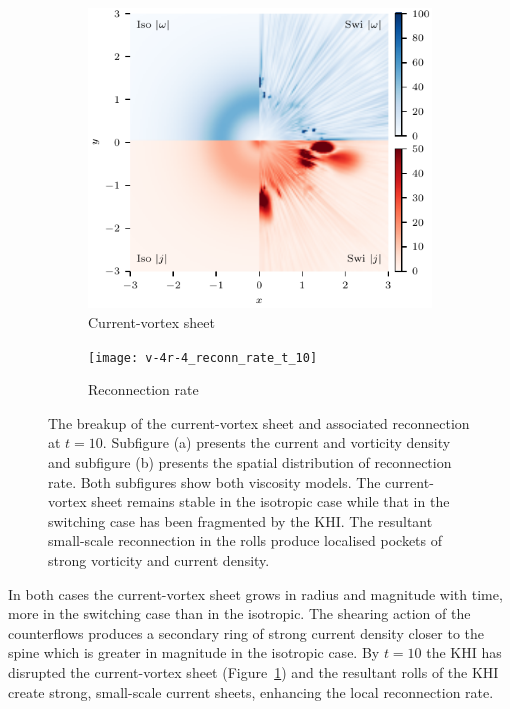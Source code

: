 \begin{figure}[t]
  \centering
    \begin{subfigure}{0.48\textwidth}
      \includegraphics[width=\linewidth]{v-4r-4_vorticity_current_ring_t_10}
      \caption{Current-vortex sheet}
      \label{fig:v-4r-4_vorticity_current_ring_t_10}
    \end{subfigure}
    \hfill
    \begin{subfigure}{0.48\textwidth}
      \texttt{[image: v-4r-4\_reconn\_rate\_t\_10]}
      \caption{Reconnection rate}
      \label{fig:v-4r-4_reconn_rate_t_10}
    \end{subfigure}
\caption{The breakup of the current-vortex sheet and associated reconnection at $t=10$. Subfigure (a) presents the current and vorticity density and subfigure (b) presents the spatial distribution of reconnection rate. Both subfigures show both viscosity models. The current-vortex sheet remains stable in the isotropic case while that in the switching case has been fragmented by the KHI. The resultant small-scale reconnection in the rolls produce localised pockets of strong vorticity and current density.}
\end{figure}

In both cases the current-vortex sheet grows in radius and magnitude with time, more in the switching case than in the isotropic. The shearing action of the counterflows produces a secondary ring of strong current density closer to the spine which is greater in magnitude in the isotropic case. By $t=10$ the KHI has disrupted the current-vortex sheet (Figure~\ref{fig:v-4r-4_vorticity_current_ring_t_10}) and the resultant rolls of the KHI create strong, small-scale current sheets, enhancing the local reconnection rate. 

